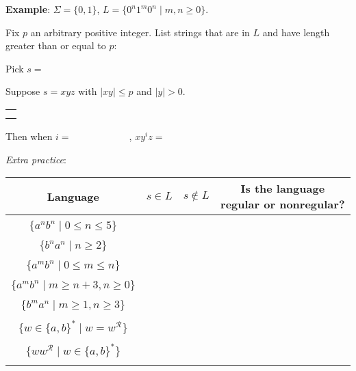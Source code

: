 \documentclass[12pt, oneside]{article}
\begin{document}
\vspace{30pt} 

{\bf Example}: $\Sigma  =  \{0,1\}$, $L = \{0^n1^m0^n  \mid m,n  \geq 0\}$.

Fix $p$ an arbitrary positive integer. List strings that are in $L$ and have length  greater than or equal  to $p$:

\vspace{10pt}

Pick $s = $


Suppose $s = xyz$ with  $|xy|  \leq  p$ and $|y| > 0$.
\begin{center}
\begin{tabular}{|c|}
\hline
 \\
\hspace{4in} \\
\hline
\end{tabular}
\end{center}
Then when $i = \hspace{1in}$, $xy^i z  = \hspace{1in}$

\newpage
{\it Extra practice}:


\begin{center}
    \begin{tabular}{c|c| c| c}
    Language & $s \in L$ & $s \notin L$ & Is the language regular or nonregular?  \\
    \hline
     & \hspace{1in} & \hspace{1in}  &  \\
    $\{a^nb^n \mid 0  \leq n  \leq 5 \}$ & & & \\
     & & & \\
    $\{b^n a^n \mid  n  \geq 2\}$  & & & \\
     & & & \\
    $\{a^m b^n \mid  0 \leq m\leq n\}$  & & & \\
     & & & \\
    $\{a^m b^n \mid  m \geq n+3,  n \geq 0\}$  & & & \\
     & & & \\
    $\{b^m a^n \mid  m \geq 1, n \geq  3\}$  & & & \\
     & & & \\
    $\{ w  \in \{a,b\}^* \mid w = w^\mathcal{R} \}$ & & & \\
     & & & \\ 
    $\{ ww^\mathcal{R} \mid w\in \{a,b\}^* \}$ & & & \\
     & & & \\ 
    \end{tabular}
\end{center}
     \vfill
\end{document}
